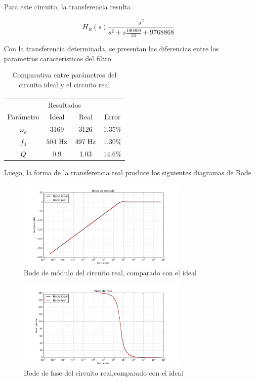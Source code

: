 Para este circuito, la transferencia resulta

\begin{equation}
	H_R(s)\frac{s^2}{s^2+s \frac{100000}{33}+9768868}
\end{equation}

Con la transferencia determinada, se presentan las diferencias entre los parametros caracteristicos del filtro

\begin{table}[H]
\centering
\begin{tabular}{|c|c|c|c|}
\multicolumn{4}{c}{\textbf{}}\\
\hline
\multicolumn{4}{|c|}{Resultados}\\
\cline{1-4}
Par\'ametro & Ideal & Real &  Error   \\
\hline
$\omega_o$ & 3169 & 3126 &$1.35\%$\\
\hline
$f_0$ & $504\ \si{\hertz}$ & $497\ \si{\hertz}$ & $1.30\%$ \\
\hline
$Q$ & 0.9 & 1.03 & $14.6\%$ \\
\hline

\end{tabular}
\caption{Comparativa entre par\'ametros del circuito ideal y el circuito real}
\label{tabla-datos}
\end{table}

Luego, la forma de la transferencia real produce los siguientes diagramas de Bode

\begin{figure}[h]
	\centering
	\includegraphics[width=8.3cm]{imagenes/BodeReal}	\caption{Bode de m\'odulo del circuito real, comparado con el ideal}	
\end{figure}
\pagebreak
\begin{figure}[h]
	\centering
	\includegraphics[width=8.3cm]{imagenes/FaseReal}	\caption{Bode de fase del circuito real,comparado con el ideal}	
\end{figure}

